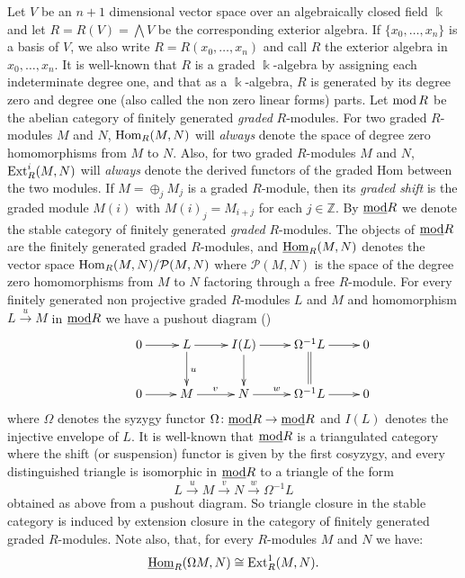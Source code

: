 \documentclass[10pt]{amsart}
\begin{document}
Let $V$ be an $n+1$ dimensional vector space over an algebraically closed field $\Bbbk$ and 
let $R =R(V)= \bigwedge V$ be the corresponding exterior  algebra.  If $\{x_0,\ldots ,x_n\}$ is a basis 
of $V$, we also write $R= R(x_0,\ldots ,x_n)$ and
call $R$ the exterior algebra in $x_0,\ldots ,x_n$. It is well-known that $R$ 
is a graded $\Bbbk$-algebra by assigning each indeterminate degree one, and that as a $\Bbbk$-algebra, 
$R$ is generated by its degree zero and degree one (also called the non zero linear forms) parts.
 Let $\operatorname{mod} R$ be the abelian category of finitely generated {\em graded} $R$-modules. 
For two graded $R$-modules $M$ and $N$, $\operatorname{Hom}_R(M,N)$ will {\it always} denote the space of degree 
zero homomorphisms from $M$ to $N$. Also, for two graded $R$-modules $M$ and $N$, $\operatorname{Ext}\nolimits_R^i(M,N)$ 
will {\em always} denote the derived functors of the graded Hom between the two modules. If $M = \oplus_jM_j$
 is a graded $R$-module, then its {\it graded shift} 
is the graded module $M(i)$  with $M(i)_j=M_{i+j}$ for each $j\in\mathbb Z$.  By $\underline{\operatorname{mod}} R$ 
we denote the stable category of finitely generated {\it graded} $R$-modules.  
The objects of $\underline{\operatorname{mod}} R$ are the finitely generated graded $R$-modules, 
and $\underline{\operatorname{Hom}}_R(M,N)$ denotes the vector space $\operatorname{Hom}_R(M,N)/{\mathcal P(M,N)}$ 
where $\mathcal P(M,N)$ is the space of the degree zero homomorphisms from $M$ to $N$ 
factoring through a free $R$-module. For every finitely generated non projective graded 
$R$-modules $L$ and $M$ and homomorphism  $L\stackrel{u}\rightarrow M$ in 
$\underline{\operatorname{mod}} R$ we have a pushout diagram (\cite{H}) 
$$ 
\xymatrix
{ &0\ar[r]&L \ar^{u}[d]
\ar[r] &I(L)\ar[d]\ar[r]
&\Omega^{-1}L\ar@{=}[d] \ar[r] &0\\ &0 \ar[r] &M \ar^{v}[r]
&N\ar^{w}[r] &\Omega^{-1}L\ar[r]& 0} 
$$
\noindent where $\Omega$ denotes the syzygy functor  
$\Omega\colon\underline{\operatorname{mod}} R\rightarrow\underline{\operatorname{mod}} R$ and $I(L)$ 
denotes the injective envelope of $L$. It is well-known that $\underline{\operatorname{mod}} R$ 
is a triangulated category where the shift (or suspension) functor is given by the first cosyzygy, 
and every distinguished triangle is isomorphic in $\underline{\operatorname{mod}}  R$ to a triangle of the form 
 $$L\stackrel{u}\longrightarrow M\stackrel{v}\longrightarrow N\stackrel{w}\longrightarrow\Omega^{-1}L$$ 
obtained  as above from a pushout diagram.
\noindent So triangle closure in the stable category is induced by extension closure in the 
category of finitely generated graded $R$-modules. Note also, that, for every 
$R$-modules $M$ and $N$ we have:
$$\underline{\operatorname{Hom}}_R(\Omega M,N)\cong\operatorname{Ext}\nolimits^1_R(M,N).$$
\end{document}
